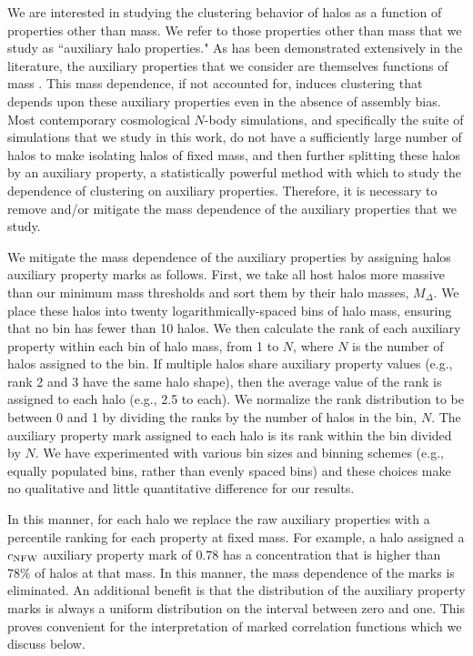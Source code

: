 \documentclass[usenatbib,fleqn]{mnras}
\begin{document}
We are interested in studying the clustering behavior of halos as a function of 
properties other than mass. We refer to those properties other than mass that we study as ``auxiliary halo properties." As has been demonstrated extensively in the literature, the auxiliary properties that we consider are themselves functions 
of mass \citep{bullock_etal02,allgood_etal06, duffy_etal08, despali_etal16}. 
This mass dependence, if not accounted for, induces clustering that depends upon these auxiliary properties even in the absence of assembly bias. Most contemporary cosmological $N$-body simulations, and specifically the suite of simulations 
that we study in this work, do not have a sufficiently large number of halos to make isolating halos of fixed mass, and then further splitting these halos by an auxiliary property, a statistically powerful method with which to study the dependence of clustering on auxiliary properties. Therefore, it is necessary to remove and/or mitigate the mass dependence of the auxiliary properties that we study. 

We mitigate the mass dependence of the auxiliary properties by assigning halos auxiliary property marks as follows. First, we take all host halos more massive than our minimum mass thresholds and sort them by their halo masses, $M_{\Delta}$. We place these halos into twenty logarithmically-spaced bins of halo mass, ensuring that no bin has fewer than 10 halos. We then calculate the rank of each auxiliary property within each bin of halo mass, from 1 to $N$, where $N$ is the number of halos assigned to the bin. If multiple halos share auxiliary property values (e.g., rank 2 and 3 have the same halo shape), then the average value of the rank is assigned to each halo (e.g., 2.5 to each). We normalize the rank distribution to be between 0 and 1 by dividing the ranks by the number of halos in the bin, $N$. The auxiliary property mark assigned to each halo is its rank within the bin divided by $N$. We have experimented with various bin sizes and binning schemes (e.g., equally populated bins, rather than evenly spaced bins) and these choices make no qualitative and little quantitative difference for our results.

In this manner, for each halo we replace the raw auxiliary properties with a percentile ranking for each property at fixed mass. For example, a halo assigned a $c_{\rm NFW}$ auxiliary property mark of $0.78$ has a concentration that is higher than $78\%$ of halos at that mass. In this manner, the mass dependence of the marks is eliminated. An additional benefit is that the distribution of the auxiliary property marks is always a uniform distribution on the interval between zero and one. This proves convenient for the interpretation of marked correlation functions which we discuss below.
\end{document}
